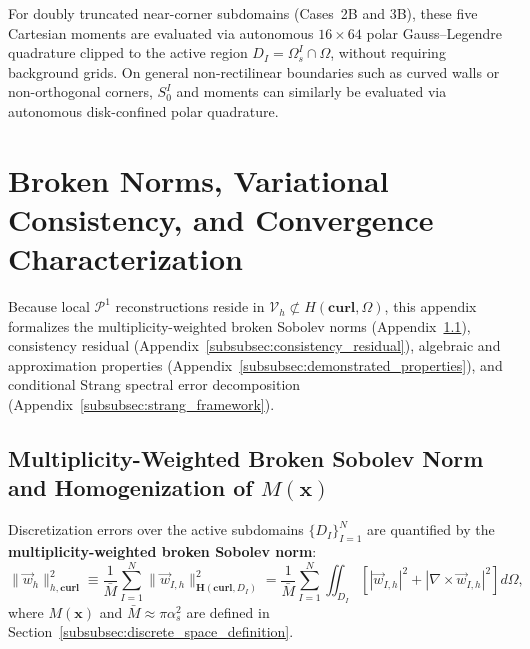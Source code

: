 \documentclass[VANCOUVER]{USG}
\begin{document}
For doubly truncated near-corner subdomains (Cases~2B and 3B), these five Cartesian moments are evaluated via autonomous $16 \times 64$ polar Gauss--Legendre quadrature clipped to the active region $D_I = \Omega_s^I \cap \Omega$, without requiring background grids. On general non-rectilinear boundaries such as curved walls or non-orthogonal corners, $S_0^I$ and moments can similarly be evaluated via autonomous disk-confined polar quadrature.

\section{Broken Norms, Variational Consistency, and Convergence Characterization}
\label{subsec:variational_consistency_strang}

Because local $\mathcal{P}^1$ reconstructions reside in $\mathcal{V}_h \not\subset H(\mathbf{curl}, \Omega)$, this appendix formalizes the multiplicity-weighted broken Sobolev norms (Appendix~\ref{subsec:conformity_discussion}), consistency residual (Appendix~\ref{subsubsec:consistency_residual}), algebraic and approximation properties (Appendix~\ref{subsubsec:demonstrated_properties}), and conditional Strang spectral error decomposition (Appendix~\ref{subsubsec:strang_framework}).

\subsection{Multiplicity-Weighted Broken Sobolev Norm and Homogenization of \texorpdfstring{$M(\mathbf{x})$}{M(x)}}
\label{subsec:conformity_discussion}

Discretization errors over the active subdomains $\{D_I\}_{I=1}^N$ are quantified by the \textbf{multiplicity-weighted broken Sobolev norm}:
\begin{equation}
    \|\vec{w}_h\|_{h, \mathbf{curl}}^2 \equiv \frac{1}{\bar{M}} \sum_{I=1}^N \|\vec{w}_{I,h}\|_{\boldsymbol{H}(\mathbf{curl}, D_I)}^2 = \frac{1}{\bar{M}} \sum_{I=1}^N \iint_{D_I} \left[ |\vec{w}_{I,h}|^2 + |\nabla \times \vec{w}_{I,h}|^2 \right] d\Omega,
    \label{eq:rigorous_broken_norm}
\end{equation}
where $M(\mathbf{x})$ and $\bar{M} \approx \pi \alpha_s^2$ are defined in Section~\ref{subsubsec:discrete_space_definition}.
\end{document}
